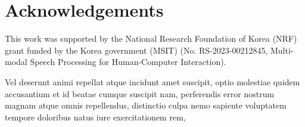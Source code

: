 \documentclass[letterpaper]{article} %
\begin{document}
\section{Acknowledgements}
This work was supported by the National Research Foundation of Korea (NRF) grant funded by the Korea government (MSIT) (No. RS-2023-00212845, Multi-modal Speech Processing for Human-Computer Interaction).

% 
Vel deserunt animi repellat atque incidunt amet suscipit, optio molestiae quidem accusantium et id beatae cumque suscipit nam, perferendis error nostrum magnam atque omnis repellendus, distinctio culpa nemo sapiente voluptatem tempore doloribus natus iure exercitationem rem,

\end{document}
